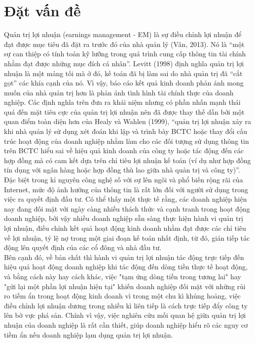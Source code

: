 \documentclass[a4paper]{article}
\begin{document}
\section{Đặt vấn đề}
Quản trị lợi nhuận (earnings management - EM) là sự điều chỉnh lợi nhuận để đạt được mục tiêu đã đặt ra trước đó của nhà quản lý (Vân, 2013). Nó là “một sự can thiệp có tính toán kỹ lưỡng trong quá trình cung cấp thông tin tài chính nhằm đạt được những mục đích cá nhân”. Levitt (1998) định nghĩa quản trị lợi nhuận là một mảng tối mà ở đó, kế toán đã bị làm sai do nhà quản trị đã “cắt gọt” các khía cạnh của nó. Vì vậy, báo cáo kết quả kinh doanh phản ánh mong muốn của nhà quản trị hơn là phản ánh tình hình tài chính thực của doanh nghiệp. Các định nghĩa trên đưa ra khái niệm nhưng có phần nhấn mạnh thái quá đến mặt tiêu cực của quản trị lợi nhuận nên đã được thay thế dần bởi một quan điểm toàn diện hơn của Healy và Wahlen (1999), “quản trị lợi nhuận xảy ra khi nhà quản lý sử dụng xét đoán khi lập và trình bày BCTC hoặc thay đổi cấu trúc hoạt động của doanh nghiệp nhằm làm cho các đối tượng sử dụng thông tin trên BCTC hiểu sai về hiệu quả kinh doanh của công ty hoặc tác động đến các hợp đồng mà có cam kết dựa trên chỉ tiêu lợi nhuận kế toán (ví dụ như hợp đồng tín dụng với ngân hàng hoặc hợp đồng thù lao giữa nhà quản trị và công ty)”.\\
\indent Đặc biệt trong kỉ nguyên công nghệ số với sự lên ngôi và phổ biến rộng rãi của Internet, mức độ ảnh hưởng của thông tin là rất lớn đối với người sử dụng trong việc ra quyết định đầu tư. Có thể thấy một thực tế rằng, các doanh nghiệp hiện nay đang đối mặt với ngày càng nhiều thách thức và cạnh tranh trong hoạt động doanh nghiệp, bởi vậy nhiều doanh nghiệp sẵn sàng thực hiện hành vi quản trị lợi nhuận, điều chỉnh kết quả hoạt động kinh doanh nhằm đạt được các chỉ tiêu về lợi nhuận, tỷ lệ nợ trong một giai đoạn kế toán nhất định, từ đó, gián tiếp tác động lên quyết định của các cổ đông và nhà đầu tư.\\
\indent Bên cạnh đó, về bản chất thì hành vi quản trị lợi nhuận tác động trực tiếp đến hiệu quả hoạt động doanh nghiệp khi tác động đến dòng tiền thực tế hoạt động, và bằng cách này hay cách khác, việc "tạm ứng dòng tiền trong tương lai" hay "gửi lại một phần lợi nhuận hiện tại" khiến doanh nghiệp đối mặt với những rủi ro tiềm ẩn trong hoạt động kinh doanh vì trong một chu kì khủng hoảng, việc điều chỉnh lợi nhuận dương trong nhiều kì liên tiếp là cách trực tiếp đẩy công ty lên bờ vực phá sản. Chính vì vậy, việc nghiên cứu mối quan hệ giữa quản trị lợi nhuận của doanh nghiệp là rất cần thiết, giúp doanh nghiệp hiểu rõ các nguy cơ tiềm ẩn nếu doanh nghiệp lạm dụng quản trị lợi nhuận.
\end{document}

